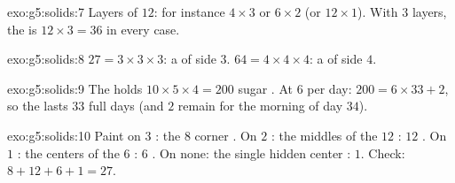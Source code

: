 \begin{solution}{exo:g5:solids:7}
Layers of $12$: for instance $4 \times 3$ or $6 \times 2$ (or
$12 \times 1$). With $3$ layers, the  is
$12 \times 3 = 36$  in every case.
\end{solution}

\begin{solution}{exo:g5:solids:8}
$27 = 3 \times 3 \times 3$: a  of side $3$.
$64 = 4 \times 4 \times 4$: a  of side $4$.
\end{solution}

\begin{solution}{exo:g5:solids:9}
The  holds $10 \times 5 \times 4 = 200$ sugar . At $6$ per
day: $200 = 6 \times 33 + 2$, so the  lasts $33$ full days (and
$2$  remain for the morning of day $34$).
\end{solution}

\begin{solution}{exo:g5:solids:10}
Paint on $3$ : the $8$ corner . On $2$ : the middles
of the $12$ : $12$ . On $1$ : the centers of the $6$
: $6$ . On none: the single hidden center : $1$.
Check: $8 + 12 + 6 + 1 = 27$. \checkmark
\end{solution}
